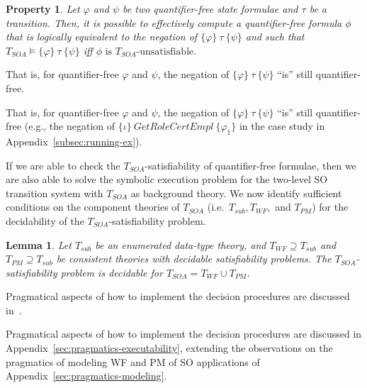 \documentclass[conference]{IEEEtran}
\newtheorem{lemma}{Lemma}
\newtheorem{property}{Property}
\newcommand{\close}{\IEEEQEDclosed}
\begin{document}
\begin{property}
  \label{prop:pre-comp-se}
  Let $\varphi$ and $\psi$ be two quantifier-free state formulae and
  $\tau$ be a transition.  Then, it is possible to effectively compute
  a quantifier-free formula $\phi$ that is logically equivalent to the
  negation of $\{ \varphi \} ~\tau~ \{ \psi\}$ and such that
  $T_\mathit{SOA}\models \{ \varphi \} ~\tau~ \{ \psi\}$ iff $\phi
  \mbox{ is $T_\mathit{SOA}$-unsatisfiable.}$ \hfill \close
\end{property}

\begin{SHORT}
  That is, for quantifier-free $\varphi$ and $\psi$, the negation of
  $\{ \varphi \} ~\tau~ \{ \psi\}$ ``is'' still quantifier-free.
\end{SHORT}
\begin{LONG}
  That is, for quantifier-free $\varphi$ and $\psi$, the negation of
  $\{ \varphi \} ~\tau~ \{ \psi\}$ ``is'' still quantifier-free (e.g.,
  the negation of $\{ \iota \}~ \mathit{GetRoleCertEmpl} ~ \{
  \varphi_1\}$ in the case study in Appendix~\ref{subsec:running-ex}).
\end{LONG}

If we are able to check the $T_\mathit{SOA}$-satisfiability of
quantifier-free formulae, then we are also able to solve the symbolic
execution problem for the two-level SO transition system with
$T_\mathit{SOA}$ as background theory. We now identify sufficient
conditions on the component theories of $T_\mathit{SOA}$ (i.e.\
$T_\mathit{sub}, T_\mathit{WF},$ and $T_\mathit{PM}$) for the
decidability of the $T_\mathit{SOA}$-satisfiability problem.
\begin{lemma}
  \label{th:dec-SOA-sat}
  Let $T_\mathit{sub}$ be an enumerated data-type theory, and $T_\mathit{WF} \supseteq
  T_\mathit{sub}$ and $T_\mathit{PM} \supseteq T_\mathit{sub}$ be consistent theories with
  decidable satisfiability problems.  The $T_\mathit{SOA}$-satisfiability
  problem is decidable for $T_\mathit{SOA}= T_\mathit{WF}\cup T_\mathit{PM}$.
  \hfill \close
\end{lemma}

\begin{SHORT}
Pragmatical aspects of how to implement the decision procedures are discussed in~\cite{BRV-TR09}.
\end{SHORT}
\begin{LONG}
Pragmatical aspects of how to implement the decision procedures are discussed in Appendix~\ref{sec:pragmatics-executability}, extending the observations on the pragmatics of modeling WF and PM of SO applications of Appendix~\ref{sec:pragmatics-modeling}.
\end{LONG}
\end{document}
